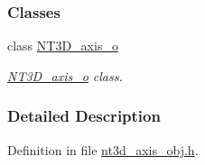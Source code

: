 \subsubsection*{Classes}
\begin{DoxyCompactItemize}
\item 
class \hyperlink{class_n_t3_d__axis__o}{NT3D\_\-axis\_\-o}
\begin{DoxyCompactList}\small\item\em \hyperlink{class_n_t3_d__axis__o}{NT3D\_\-axis\_\-o} class. \item\end{DoxyCompactList}\end{DoxyCompactItemize}


\subsubsection{Detailed Description}


Definition in file \hyperlink{nt3d__axis__obj_8h_source}{nt3d\_\-axis\_\-obj.h}.

